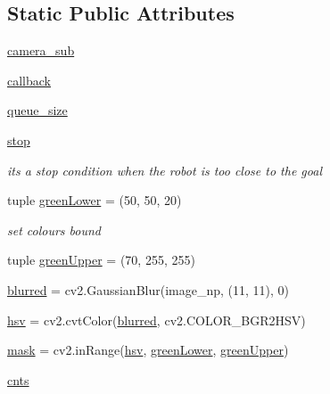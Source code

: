 \subsection*{Static Public Attributes}
\begin{DoxyCompactItemize}
\item 
\hyperlink{classcvtest_1_1image__feature_ad3e0bf357335dc4e45dacfc8cc6d89f0}{camera\+\_\+sub}
\item 
\hyperlink{classcvtest_1_1image__feature_a4e12423b98aa2b60b41f8594c1d6e99b}{callback}
\item 
\hyperlink{classcvtest_1_1image__feature_ae255c3c1c25d111c82a82e5bd02a5187}{queue\+\_\+size}
\item 
\hyperlink{classcvtest_1_1image__feature_aa42e53c028a74773c1e574909f709919}{stop}
\begin{DoxyCompactList}\small\item\em it\textquotesingle{}s a stop condition when the robot is too close to the goal \end{DoxyCompactList}\item 
tuple \hyperlink{classcvtest_1_1image__feature_aa26cd5e97c9f095fcffe440718a19770}{green\+Lower} = (50, 50, 20)
\begin{DoxyCompactList}\small\item\em set colours bound \end{DoxyCompactList}\item 
tuple \hyperlink{classcvtest_1_1image__feature_a1e044a4137c5a99ee987abf14da300c8}{green\+Upper} = (70, 255, 255)
\item 
\hyperlink{classcvtest_1_1image__feature_a85ee0bae4a9441fe6aebf107058843db}{blurred} = cv2.\+Gaussian\+Blur(image\+\_\+np, (11, 11), 0)
\item 
\hyperlink{classcvtest_1_1image__feature_ab2a73c5df818816ebbb06235e4bab1a9}{hsv} = cv2.\+cvt\+Color(\hyperlink{classcvtest_1_1image__feature_a85ee0bae4a9441fe6aebf107058843db}{blurred}, cv2.\+C\+O\+L\+O\+R\+\_\+\+B\+G\+R2\+H\+SV)
\item 
\hyperlink{classcvtest_1_1image__feature_a40f58b7123cfe0573aa79c3831ff3f6a}{mask} = cv2.\+in\+Range(\hyperlink{classcvtest_1_1image__feature_ab2a73c5df818816ebbb06235e4bab1a9}{hsv}, \hyperlink{classcvtest_1_1image__feature_aa26cd5e97c9f095fcffe440718a19770}{green\+Lower}, \hyperlink{classcvtest_1_1image__feature_a1e044a4137c5a99ee987abf14da300c8}{green\+Upper})
\item 
\hyperlink{classcvtest_1_1image__feature_aa27ede44db1c89ea7519de78a7b762ac}{cnts}
\item 

\end{DoxyCompactItemize}
